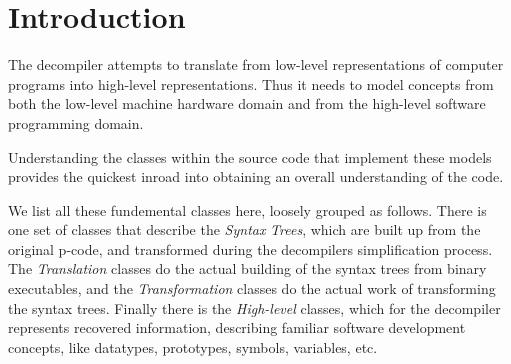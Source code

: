\hypertarget{coreclasses_coreintro}{}\section{Introduction}\label{coreclasses_coreintro}
The decompiler attempts to translate from low-\/level representations of computer programs into high-\/level representations. Thus it needs to model concepts from both the low-\/level machine hardware domain and from the high-\/level software programming domain.

Understanding the classes within the source code that implement these models provides the quickest inroad into obtaining an overall understanding of the code.

We list all these fundemental classes here, loosely grouped as follows. There is one set of classes that describe the {\itshape Syntax} {\itshape Trees}, which are built up from the original p-\/code, and transformed during the decompiler\textquotesingle{}s simplification process. The {\itshape Translation} classes do the actual building of the syntax trees from binary executables, and the {\itshape Transformation} classes do the actual work of transforming the syntax trees. Finally there is the {\itshape High-\/level} classes, which for the decompiler represents recovered information, describing familiar software development concepts, like datatypes, prototypes, symbols, variables, etc.

